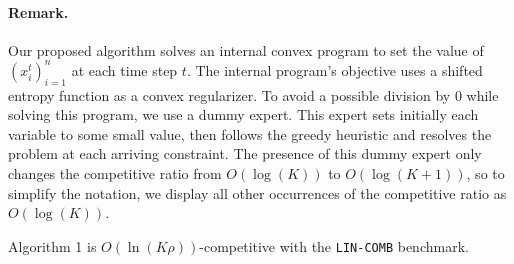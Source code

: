 \paragraph{Remark.} Our proposed algorithm solves an internal convex program to set the value of $(x_i^t)_{i=1}^n$ at each time step $t$. The internal program's objective uses a shifted entropy function as a convex regularizer. To avoid a possible division by $0$ while solving this program, we use a dummy expert. This expert sets initially each variable to some small value, then follows the greedy heuristic and resolves the problem at each arriving constraint. The presence of this dummy expert only changes the competitive ratio from $O(\log(K))$ to $O(\log(K + 1))$, so to simplify the notation, we display all other occurrences of the competitive ratio as $O(\log(K))$.


\begin{theorem} \label{covering-theorem}
Algorithm 1 is $O(\ln(K \rho))$-competitive with the \texttt{LIN-COMB} benchmark.
\end{theorem}

